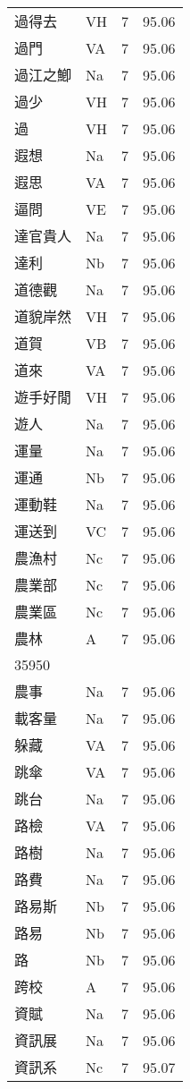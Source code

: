 \documentclass[twocolumn]{book}
\begin{document}
\begin{supertabular}{llrr}
過得去 & VH & 7 &  95.06\\
過門 & VA & 7 &  95.06\\
過江之鯽 & Na & 7 &  95.06\\
過少 & VH & 7 &  95.06\\
過 & VH & 7 &  95.06\\
遐想 & Na & 7 &  95.06\\
遐思 & VA & 7 &  95.06\\
逼問 & VE & 7 &  95.06\\
達官貴人 & Na & 7 &  95.06\\
達利 & Nb & 7 &  95.06\\
道德觀 & Na & 7 &  95.06\\
道貌岸然 & VH & 7 &  95.06\\
道賀 & VB & 7 &  95.06\\
道來 & VA & 7 &  95.06\\
遊手好閒 & VH & 7 &  95.06\\
遊人 & Na & 7 &  95.06\\
運量 & Na & 7 &  95.06\\
運通 & Nb & 7 &  95.06\\
運動鞋 & Na & 7 &  95.06\\
運送到 & VC & 7 &  95.06\\
農漁村 & Nc & 7 &  95.06\\
農業部 & Nc & 7 &  95.06\\
農業區 & Nc & 7 &  95.06\\
農林 & A & 7 &  95.06\\
35950\\
農事 & Na & 7 &  95.06\\
載客量 & Na & 7 &  95.06\\
躲藏 & VA & 7 &  95.06\\
跳傘 & VA & 7 &  95.06\\
跳台 & Na & 7 &  95.06\\
路檢 & VA & 7 &  95.06\\
路樹 & Na & 7 &  95.06\\
路費 & Na & 7 &  95.06\\
路易斯 & Nb & 7 &  95.06\\
路易 & Nb & 7 &  95.06\\
路 & Nb & 7 &  95.06\\
跨校 & A & 7 &  95.06\\
資賦 & Na & 7 &  95.06\\
資訊展 & Na & 7 &  95.06\\
資訊系 & Nc & 7 &  95.07\\

\end{supertabular}
\end{document}
